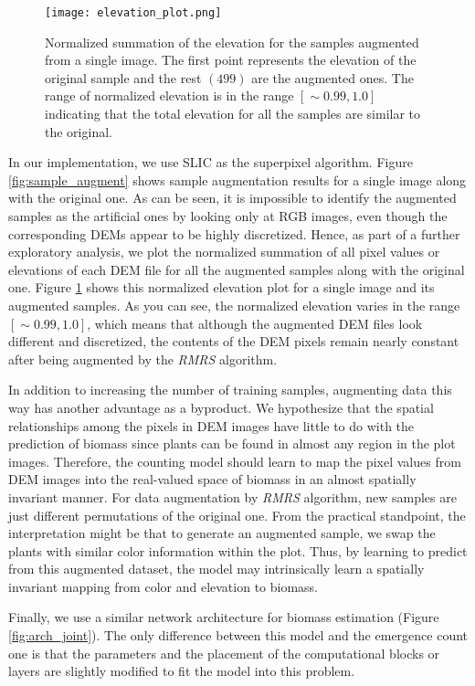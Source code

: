 \documentclass[10pt,twocolumn,letterpaper]{article}
\begin{document}
\begin{figure}[h!]
	\centering
	\texttt{[image: elevation\_plot.png]}
    \caption{Normalized summation of the elevation for the samples augmented from a single image. The first point represents the elevation of the original sample and the rest $(499)$ are the augmented ones. The range of normalized elevation is in the range $[\sim0.99,1.0]$ indicating that the total elevation for all the samples are similar to the original.}
    \label{fig:elevation_plot}
\end{figure}

In our implementation, we use SLIC \cite{SLIC} as the superpixel algorithm. Figure \ref{fig:sample_augment} shows sample augmentation results for a single image along with the original one. As can be seen, it is impossible to identify the augmented samples as the artificial ones by looking only at RGB images, even though the corresponding DEMs appear to be highly discretized. Hence, as part of a further exploratory analysis, we plot the normalized summation of all pixel values or elevations of each DEM file for all the augmented samples along with the original one. Figure \ref{fig:elevation_plot} shows this normalized elevation plot for a single image and its augmented samples. As you can see, the normalized elevation varies in the range $[\sim0.99, 1.0]$, which means that although the augmented DEM files look different and discretized, the contents of the DEM pixels remain nearly constant after being augmented by the \textit{RMRS} algorithm.

In addition to increasing the number of training samples, augmenting data this way has another advantage as a byproduct. We hypothesize that the spatial relationships among the pixels in DEM images have little to do with the prediction of biomass since plants can be found in almost any region in the plot images. Therefore, the counting model should learn to map the pixel values from DEM images into the real-valued space of biomass in an almost spatially invariant manner. For data augmentation by \textit{RMRS} algorithm, new samples are just different permutations of the original one. From the practical standpoint, the interpretation might be that to generate an augmented sample, we swap the plants with similar color information within the plot. Thus, by learning to predict from this augmented dataset, the model may intrinsically learn a spatially invariant mapping from color and elevation to biomass.


Finally, we use a similar network architecture for biomass estimation (Figure \ref{fig:arch_joint}). The only difference between this model and the emergence count one is that the parameters and the placement of the computational blocks or layers are slightly modified to fit the model into this problem.
\end{document}
